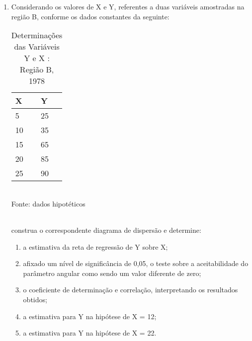 \begin{enumerate}[resume]
\item Considerando os valores de X e Y, referentes a duas variáveis amostradas na região B, conforme os dados constantes da seguinte:
	\begin{table}[!htb]
	\centering
	\caption{Determinações das Variáveis Y e X : Região B, 1978}
	\vspace{0.5cm}
	\begin{tabular}{ll}
	X & Y \\
	\hline 
	5 & 25  \\
	10 & 35  \\
	15 & 65 \\
	20 & 85  \\
	25 & 90  \\
	\end{tabular}\\
	Fonte: dados hipotéticos\\
	\end{table}\\	
	construa o correspondente diagrama de dispersão e determine:
	\begin{enumerate}
	\item a estimativa da reta de regressão de Y sobre X;
	\item afixado um nível de significância de 0,05, o teste sobre a aceitabilidade do parâmetro angular como sendo um valor diferente de zero;
	\item o coeficiente de determinação e correlação, interpretando os resultados obtidos;
	\item	a estimativa para Y na hipótese de X = 12;
	\item	a estimativa para Y na hipótese de X = 22.
	\end{enumerate}


\end{enumerate}
